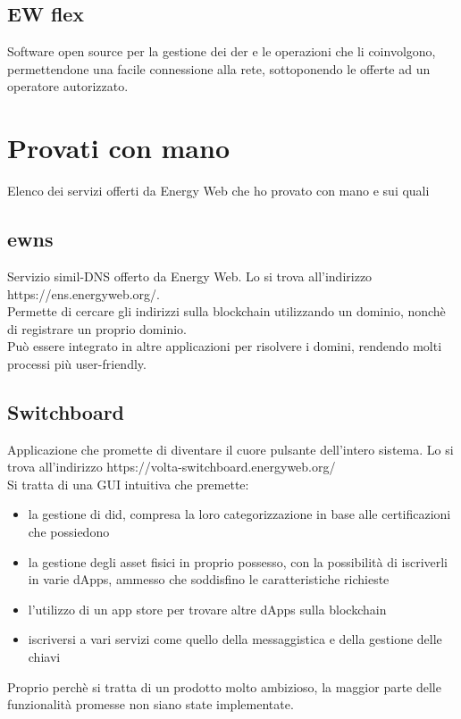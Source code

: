 \documentclass[12pt, letterpaper, twoside]{article}
\begin{document}
\subsection{EW flex}
Software open source per la gestione dei \gls{der} e le operazioni che li coinvolgono, permettendone una facile connessione alla rete, sottoponendo le offerte ad un operatore autorizzato.

\newpage

\section{Provati con mano}
Elenco dei servizi offerti da Energy Web che ho provato con mano e sui quali 

\subsection{\gls{ewns}}
Servizio simil-DNS offerto da Energy Web. Lo si trova all'indirizzo https://ens.energyweb.org/.\\
Permette di cercare gli indirizzi sulla blockchain utilizzando un dominio, nonchè di registrare un proprio dominio.\\
Può essere integrato in altre applicazioni per risolvere i domini, rendendo molti processi più user-friendly.

\subsection{Switchboard}
Applicazione che promette di diventare il cuore pulsante dell'intero sistema. Lo si trova all'indirizzo https://volta-switchboard.energyweb.org/ \\
Si tratta di una GUI intuitiva che premette:
\begin{itemize}
    \item la gestione di \gls{did}, compresa la loro categorizzazione in base alle certificazioni che possiedono
    \item la gestione degli asset fisici in proprio possesso, con la possibilità di iscriverli in varie dApps, ammesso che soddisfino le caratteristiche richieste
    \item l'utilizzo di un app store per trovare altre dApps sulla blockchain
    \item iscriversi a vari servizi come quello della messaggistica e della gestione delle chiavi
\end{itemize}
Proprio perchè si tratta di un prodotto molto ambizioso, la maggior parte delle funzionalità promesse non siano state implementate.
\end{document}
